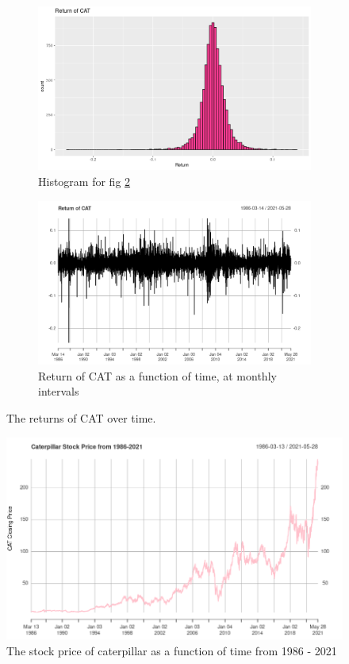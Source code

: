 \documentclass{article}
\begin{document}
\begin{figure}[h]
	\centering
	\begin{subfigure}{\linewidth}
		\includegraphics[width=\linewidth]{return_of_cat_histo}
		\caption{Histogram for fig \ref{fig:returnCat}}
		\label{fig:returnHisto}
	\end{subfigure}
	\centering
	\begin{subfigure}{\linewidth}
		\includegraphics[width=\linewidth]{return_of_cat}
		\caption{Return of CAT as a function of time, at monthly intervals}
		\label{fig:returnCat}
	\end{subfigure}
	\caption{The returns of CAT over time.}
	\label{fig:return}
\end{figure}

\begin{figure}[h]
	\includegraphics[width=\linewidth]{caterpillar_stock_price}
	\caption{The stock price of caterpillar as a function of time from 1986 - 2021}
	\label{fig:stockPrices}
\end{figure}
\clearpage
\end{document}
